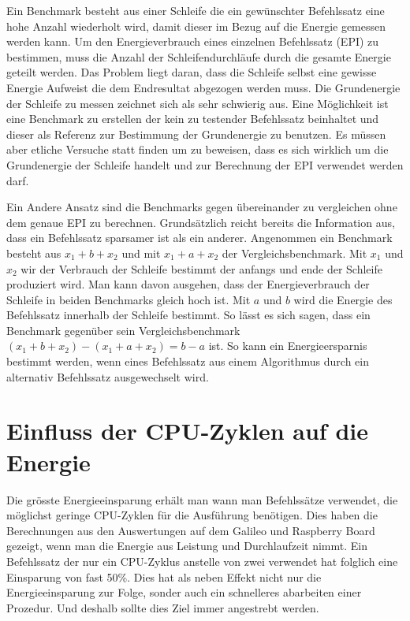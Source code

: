Ein Benchmark besteht aus einer Schleife die ein gewünschter Befehlssatz eine hohe Anzahl wiederholt wird, damit dieser im Bezug auf die Energie gemessen werden kann. Um den Energieverbrauch eines einzelnen Befehlssatz (EPI) zu bestimmen, muss die Anzahl der Schleifendurchläufe durch die gesamte Energie geteilt werden. Das Problem liegt daran, dass die Schleife selbst eine gewisse Energie Aufweist die dem Endresultat abgezogen werden muss. Die Grundenergie der Schleife zu messen zeichnet sich als sehr schwierig aus. Eine Möglichkeit ist eine Benchmark zu erstellen der kein zu testender Befehlssatz beinhaltet und dieser als Referenz zur Bestimmung der Grundenergie zu benutzen. Es müssen aber etliche Versuche statt finden um zu beweisen, dass es sich wirklich um die Grundenergie der Schleife handelt und zur Berechnung der EPI verwendet werden darf.
\par
Ein Andere Ansatz sind die Benchmarks gegen übereinander zu vergleichen ohne dem genaue EPI zu berechnen. Grundsätzlich reicht bereits die Information aus, dass ein Befehlssatz sparsamer ist als ein anderer. Angenommen ein Benchmark besteht aus $x_1 + b + x_2$ und mit $x_1 + a + x_2$ der Vergleichsbenchmark. Mit $x_1$ und $x_2$ wir der Verbrauch der Schleife bestimmt der anfangs und ende der Schleife produziert wird. Man kann davon ausgehen, dass der Energieverbrauch der Schleife in beiden Benchmarks gleich hoch ist. Mit $a$ und $b$ wird die Energie des Befehlssatz innerhalb der Schleife bestimmt. So lässt es sich sagen, dass ein Benchmark gegenüber sein Vergleichsbenchmark $(x_1 + b + x_2) - (x_1 + a + x_2) = b - a$ ist. So kann ein Energieersparnis bestimmt werden, wenn eines Befehlssatz aus einem Algorithmus durch ein alternativ Befehlssatz ausgewechselt wird.



\section{Einfluss der CPU-Zyklen auf die Energie}
Die grösste Energieeinsparung erhält man wann man Befehlssätze verwendet, die möglichst geringe CPU-Zyklen für die Ausführung benötigen. Dies haben die Berechnungen aus den Auswertungen auf dem Galileo und Raspberry Board gezeigt, wenn man die Energie aus Leistung und Durchlaufzeit nimmt. Ein Befehlssatz der nur ein CPU-Zyklus anstelle von zwei verwendet hat folglich eine Einsparung von fast 50\%. Dies hat als neben Effekt nicht nur die Energieeinsparung zur Folge, sonder auch ein schnelleres abarbeiten einer Prozedur. Und deshalb sollte dies Ziel immer angestrebt werden.

